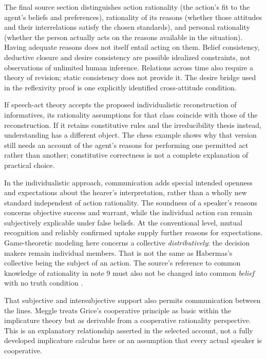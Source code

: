 The final source section distinguishes action rationality (the action's
fit to the agent's beliefs and preferences), rationality of its reasons
(whether those attitudes and their interrelations satisfy the chosen
standards), and personal rationality (whether the person actually acts
on the reasons available in the situation). Having adequate reasons
does not itself entail acting on them. Belief consistency, deductive
closure and desire consistency are possible idealized constraints,
not observations of unlimited human inference. Relations across time
also require a theory of revision; static consistency does not provide it.
The desire bridge used in the reflexivity proof is one explicitly
identified cross-attitude condition.

If speech-act theory accepts the proposed individualistic reconstruction
of informatives, its rationality assumptions for that class coincide
with those of the reconstruction. If it retains constitutive rules and
the irreducibility thesis instead, understanding has a different object.
The chess example shows why that version still needs an account of the
agent's reasons for performing one permitted act rather than another;
constitutive correctness is not a complete explanation of practical choice.

In the individualistic approach, communication adds special intended
openness and expectations about the hearer's interpretation, rather than
a wholly new standard independent of action rationality. The soundness
of a speaker's reasons concerns objective success and warrant, while the
individual action can remain subjectively explicable under false beliefs.
At the conventional level, mutual recognition and reliably confirmed
uptake supply further reasons for expectations. Game-theoretic modeling
here concerns a collective \emph{distributively}: the decision makers
remain individual members. That is not the same as Habermas's collective
being the subject of an action. The source's reference to common knowledge
of rationality in note 9 must also not be changed into common \emph{belief}
with no truth condition
\cite[pp.~608--609, nn.~8--9]{Meggle2021RationalityCommunication}.

That subjective and intersubjective support also permits communication
between the lines. Meggle treats Grice's cooperative principle as basic
within the implicature theory but as derivable from a cooperative
rationality perspective. This is an explanatory relationship asserted
in the selected account, not a fully developed implicature calculus here
or an assumption that every actual speaker is cooperative.

